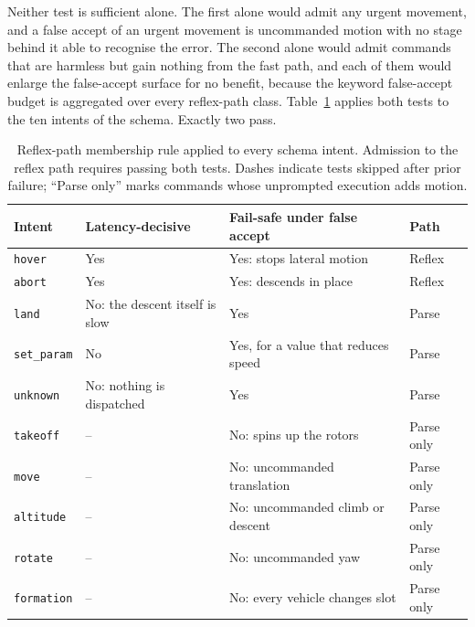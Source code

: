 Neither test is sufficient alone. The first alone would admit any urgent movement, and a false
accept of an urgent movement is uncommanded motion with no stage behind it able to recognise the
error. The second alone would admit commands that are harmless but gain nothing from the fast
path, and each of them would enlarge the false-accept surface for no benefit, because the
keyword false-accept budget is aggregated over every reflex-path class. Table~\ref{tab:membership}
applies both tests to the ten intents of the schema. Exactly two pass.

\begin{table}[htbp]
\centering
\footnotesize
\caption[Reflex-path membership rule applied to the ten intents]{Reflex-path membership rule applied to every schema intent. Admission to the reflex path requires passing both tests. Dashes indicate tests skipped after prior failure; ``Parse only'' marks commands whose unprompted execution adds motion.}
\label{tab:membership}
\begin{tabularx}{\textwidth}{@{}l X X l@{}}
\toprule
Intent & Latency-decisive & Fail-safe under false accept & Path \\
\midrule
\texttt{hover}     & Yes & Yes: stops lateral motion & Reflex \\
\texttt{abort}     & Yes & Yes: descends in place & Reflex \\
\texttt{land}      & No: the descent itself is slow & Yes & Parse \\
\texttt{set\_param} & No & Yes, for a value that reduces speed & Parse \\
\texttt{unknown}   & No: nothing is dispatched & Yes & Parse \\
\texttt{takeoff}   & -- & No: spins up the rotors & Parse only \\
\texttt{move}      & -- & No: uncommanded translation & Parse only \\
\texttt{altitude}  & -- & No: uncommanded climb or descent & Parse only \\
\texttt{rotate}    & -- & No: uncommanded yaw & Parse only \\
\texttt{formation} & -- & No: every vehicle changes slot & Parse only \\
\bottomrule
\end{tabularx}
\end{table}

